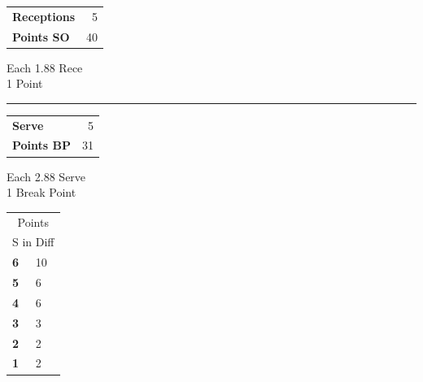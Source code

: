 \documentclass[a4paper,10pt]{scrartcl}
\begin{document}
\begin{minipage}{0.95\linewidth}
\begin{minipage}{0.48\linewidth}
{\begin{tabular}{l l l l | r r r r}
      \end{tabular}
    }
  \end{minipage}
  \begin{minipage}{0.16\linewidth}
    {\normalsize
      \begin{tabular}{l r}
        \textbf{Receptions} & 5 \\
        \textbf{Points SO}  & 40 \\
      \end{tabular}
      \begin{center}
        Each 1.88 Rece\\
        1 Point
      \end{center}
      \noindent\rule{\textwidth}{1pt}
      \begin{tabular}{l r}
        \textbf{Serve}     & 5 \\
        \textbf{Points BP} & 31 \\
      \end{tabular}
      \begin{center}
        Each 2.88 Serve\\
        1 Break Point
      \end{center}
    }
  \end{minipage}
  \begin{minipage}{0.01\textwidth}
    \begin{tabular}{l l}
      \multicolumn{2}{c}{
        Points }                    \\
      \multicolumn{2}{c}{S in Diff} \\
      \midrule
      
      \textbf{ 6 } & 10 \\ 
      
      \textbf{ 5 } & 6 \\ 
      
      \textbf{ 4 } & 6 \\ 
      
      \textbf{ 3 } & 3 \\ 
      
      \textbf{ 2 } & 2 \\ 
      
      \textbf{ 1 } & 2 \\ 
      
    \end{tabular}
  \end{minipage}
\end{minipage}
\end{document}
